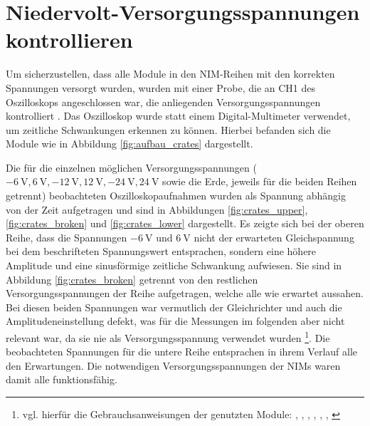 \section{Niedervolt-Versorgungsspannungen kontrollieren}

Um sicherzustellen, dass alle Module in den NIM-Reihen mit den korrekten Spannungen versorgt wurden, wurden mit einer Probe, die an CH1 des Oszilloskops angeschlossen war, die anliegenden Versorgungsspannungen kontrolliert \cite[3]{525va}. Das Oszilloskop wurde statt einem Digital-Multimeter verwendet, um zeitliche Schwankungen erkennen zu können. Hierbei befanden sich die Module wie in Abbildung \ref{fig:aufbau_crates} dargestellt.

Die für die einzelnen möglichen Versorgungsspannungen ($\SI{-6}{\V}, \SI{6}{\V}, \SI{-12}{\V}, \SI{12}{\V}, \SI{-24}{\V}, \SI{24}{\V}$ sowie die Erde, jeweils für die beiden Reihen getrennt) beobachteten Oszilloskopaufnahmen wurden als Spannung abhängig von der Zeit aufgetragen und sind in Abbildungen \ref{fig:crates_upper}, \ref{fig:crates_broken} und \ref{fig:crates_lower} dargestellt. Es zeigte sich bei der oberen Reihe, dass die Spannungen $\SI{-6}{\V}$ und $\SI{6}{\V}$ nicht der erwarteten Gleichspannung bei dem beschrifteten Spannungswert entsprachen, sondern eine höhere Amplitude und eine sinusförmige zeitliche Schwankung aufwiesen. Sie sind in Abbildung \ref{fig:crates_broken} getrennt von den restlichen Versorgungsspannungen der Reihe aufgetragen, welche alle wie erwartet aussahen. Bei diesen beiden Spannungen war vermutlich der Gleichrichter und auch die Amplitudeneinstellung defekt, was für die Messungen im folgenden aber nicht relevant war, da sie nie als Versorgungsspannung verwendet wurden \footnote{vgl. hierfür die Gebrauchsanweisungen der genutzten Module: \cite{shaping_amp}, \cite{sca551}, \cite{delay_amp}, \cite{coincidence_unit}, \cite{tac}, \cite{cfd}, \cite{mca}}. Die beobachteten Spannungen für die untere Reihe entsprachen in ihrem Verlauf alle den Erwartungen. Die notwendigen Versorgungsspannungen der NIMs waren damit alle funktionsfähig.

